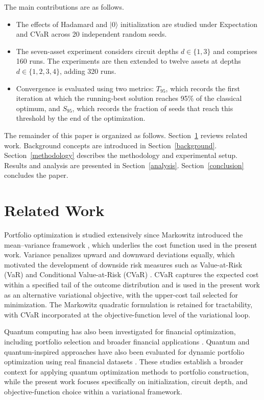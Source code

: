 \documentclass[runningheads]{llncs}
\begin{document}
The main contributions are as follows.
\begin{itemize}
    \item The effects of Hadamard and $\lvert 0\rangle$ initialization are studied under Expectation and CVaR across 20 independent random seeds.

    \item The seven-asset experiment considers circuit depths $d \in \{1,3\}$ and comprises 160 runs. The experiments are then extended to twelve assets at depths $d \in \{1,2,3,4\}$, adding 320 runs.

    \item Convergence is evaluated using two metrics: $T_{95}$, which records the first iteration at which the running-best solution reaches 95\% of the classical optimum, and $S_{95}$, which records the fraction of seeds that reach this threshold by the end of the optimization.
\end{itemize}

The remainder of this paper is organized as follows. Section~\ref{rel} reviews related work. Background concepts are introduced in Section~\ref{background}. Section~\ref{methodology} describes the methodology and experimental setup. Results and analysis are presented in Section~\ref{analysis}. Section~\ref{conclusion} concludes the paper.
\section{Related Work}\label{rel}

Portfolio optimization is studied extensively since Markowitz introduced the mean--variance framework \cite{markowitz1952}, which underlies the cost function used in the present work. Variance penalizes upward and downward deviations equally, which motivated the development of downside risk measures such as Value-at-Risk (VaR) and Conditional Value-at-Risk (CVaR) \cite{rockafellar2000}. CVaR captures the expected cost within a specified tail of the outcome distribution and is used in the present work as an alternative variational objective, with the upper-cost tail selected for minimization. The Markowitz quadratic formulation is retained for tractability, with CVaR incorporated at the objective-function level of the variational loop.

Quantum computing has also been investigated for financial optimization, including portfolio selection and broader financial applications \cite{orus2019finance,egger2020finance,kerenidis2019portfolio}. Quantum and quantum-inspired approaches have also been evaluated for dynamic portfolio optimization using real financial datasets \cite{mugel2022dynamic}. These studies establish a broader context for applying quantum optimization methods to portfolio construction, while the present work focuses specifically on initialization, circuit depth, and objective-function choice within a variational framework.
\end{document}
